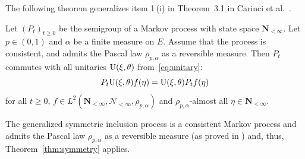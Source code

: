 The following theorem generalizes item 1\,(i) in Theorem~3.1 in Carinci et al.~\cite{carinci2019orthogonal}.

\begin{Theorem} \label{thm:symmetry}
Let $(P_t)_{t\geq 0}$ be the semigroup of a Markov process with state space $\mathbf N_{<\infty}$. Let $p\in (0,1)$ and $\alpha$ be a finite measure on $E$. Assume that the process is consistent, and admits the Pascal law $\rho_{p,\alpha}$ as a reversible measure. Then $P_t$ commutes with all unitaries ${\rm U}(\xi,\theta)$ from~\eqref{eq:unitary}:
	\[
		P_t {\rm U}(\xi,\theta) f(\eta) = {\rm U}(\xi,\theta) P_t f (\eta)
	\]
	for all $t\geq 0$, $f\in L^2(\mathbf N_{<\infty},\mathcal N_{<\infty},\rho_{p,\alpha})$ and $\rho_{p,\alpha}$-almost all $\eta\in \mathbf N_{<\infty}$.
\end{Theorem}

The generalized symmetric inclusion process is a consistent Markov process and admits the Pascal law $\rho_{p,\alpha}$ as a reversible measure (as proved in \cite[Theorem~5.2.]{IntertwiningConsistent}) and, thus, Theorem~\ref{thm:symmetry} applies.
